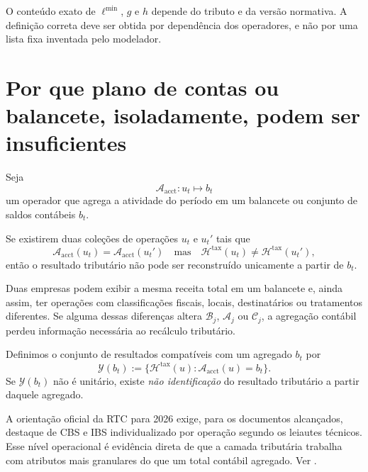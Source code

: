 \documentclass[11pt,a4paper]{article}
\newcommand{\cB}{\mathcal{B}}
\newcommand{\cA}{\mathcal{A}}
\newcommand{\cC}{\mathcal{C}}
\newcommand{\cH}{\mathcal{H}}
\begin{document}
\begin{cuidado}
O conteúdo exato de $\ell^{\min}$, $g$ e $h$ depende do tributo e da versão normativa. A definição correta deve ser obtida por dependência dos operadores, e não por uma lista fixa inventada pelo modelador.
\end{cuidado}

\section{Por que plano de contas ou balancete, isoladamente, podem ser insuficientes}

Seja
\begin{equation}
\mathcal A_{\mathrm{acct}}:u_t\longmapsto b_t
\end{equation}
um operador que agrega a atividade do período em um balancete ou conjunto de saldos contábeis $b_t$.

Se existirem duas coleções de operações $u_t$ e $u_t'$ tais que
\begin{equation}
\mathcal A_{\mathrm{acct}}(u_t)=\mathcal A_{\mathrm{acct}}(u_t')
\quad\text{mas}\quad
\cH^{\mathrm{tax}}(u_t)\neq\cH^{\mathrm{tax}}(u_t'),
\label{eq:insuf-aggregate}
\end{equation}
então o resultado tributário não pode ser reconstruído unicamente a partir de $b_t$.

\begin{intuicao}
Duas empresas podem exibir a mesma receita total em um balancete e, ainda assim, ter operações com classificações fiscais, locais, destinatários ou tratamentos diferentes. Se alguma dessas diferenças altera $\cB_j$, $\cA_j$ ou $\cC_j$, a agregação contábil perdeu informação necessária ao recálculo tributário.
\end{intuicao}

Definimos o conjunto de resultados compatíveis com um agregado $b_t$ por
\begin{equation}
\boxed{
\mathcal Y(b_t)
:=\{\cH^{\mathrm{tax}}(u):\mathcal A_{\mathrm{acct}}(u)=b_t\}.
}
\end{equation}
Se $\mathcal Y(b_t)$ não é unitário, existe \emph{não identificação} do resultado tributário a partir daquele agregado.

\begin{fonte}
A orientação oficial da RTC para 2026 exige, para os documentos alcançados, destaque de CBS e IBS individualizado por operação segundo os leiautes técnicos. Esse nível operacional é evidência direta de que a camada tributária trabalha com atributos mais granulares do que um total contábil agregado. Ver \cite{RFB_ORIENT_2026,RFB_RTC_LEG}.
\end{fonte}
\end{document}
